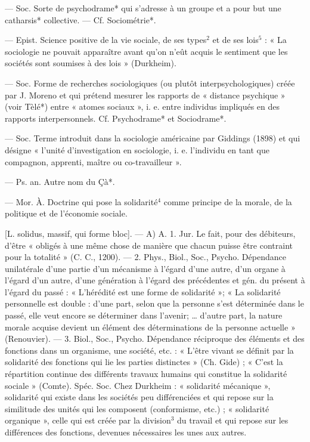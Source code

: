 \begin{itemize}[leftmargin=1cm, label=, itemsep=1pt]
 — Soc. Sorte de psychodrame* qui s'adresse à un groupe
et a pour but une catharsis* collective. — Cf. Sociométrie*.

 — Epist. Science positive
de la vie sociale, de ses types$^2$ et
de ses lois$^5$ : « La sociologie ne
pouvait apparaître avant qu’on
n’eût acquis le sentiment que les
sociétés sont soumises à des lois »
(Durkheim).

 — Soc. Forme de recherches sociologiques (ou plutôt interpsychologiques) créée par J. Moreno
et qui prétend mesurer les rapports
de « distance psychique » (voir
Tèlé*) entre « atomes sociaux », i. e.
entre individus impliqués en des
rapports interpersonnels. Cf. Psychodrame* et Sociodrame*.

 — Soc. Terme introduit dans
la sociologie américaine par Giddings (1898) et qui désigne « l’unité
d'investigation en sociologie, i. e.
l'individu en tant que compagnon,
apprenti, maître ou co-travailleur ».

 — Ps. an. Autre nom du Çà*.

 — Mor. À. Doctrine qui
pose la solidarité$^4$ comme principe
de la morale, de la politique et de
l’économie sociale.

 [L. solidus, massif, qui
forme bloc]. — A) A. 1. Jur. Le fait,
pour des débiteurs, d’être « obligés
à une même chose de manière que
chacun puisse être contraint pour
la totalité » (C. C., 1200). — 2. Phys.,
Biol., Soc., Psycho. Dépendance
unilatérale d'une partie d'un mécanisme à l'égard d’une autre, d’un
organe à l'égard d'un autre, d’une
génération à l'égard des précédentes
et gén. du présent à l'égard du
passé : « L'hérédité est une forme de
solidarité »; « La solidarité personnelle est double : d’une part, selon
que la personne s’est déterminée
dans le passé, elle veut encore se
déterminer dans l'avenir; … d’autre
part, la nature morale acquise devient un élément des déterminations de la personne actuelle » (Renouvier). — 3. Biol., Soc., Psycho.
Dépendance réciproque des éléments
et des fonctions dans un organisme,
une société, etc. : « L’être vivant se
définit par la solidarité des fonctions
qui lie les parties distinctes »
(Ch. Gide) ; « C’est la répartition
continue des différents travaux
humains qui constitue la solidarité
sociale » (Comte). Spéc. Soc. Chez
Durkheim : « solidarité mécanique »,
solidarité qui existe dans les sociétés
peu différenciées et qui repose sur
la similitude des unités qui les composent (conformisme, etc.) ; « solidarité organique », celle qui est créée
par la division$^3$ du travail et qui
repose sur les différences des fonctions,
devenues nécessaires les unes aux autres.


\end{itemize}
